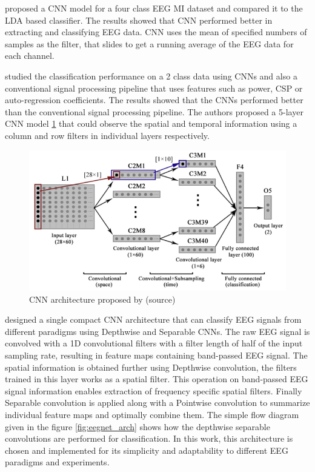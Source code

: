 \cite{2021_Online_EEG_MCNN} proposed a CNN model for a four class EEG MI dataset and compared it to the LDA based classifier. The results showed that CNN performed better in extracting and classifying EEG data. CNN uses the mean of specified numbers of samples as the filter, that slides to get a running average of the EEG data for each channel. 

\cite{2017_1trial_MIEEG_DNN} studied the classification performance on a 2 class data using CNNs and also a conventional signal processing pipeline that uses features such as power, CSP or auto-regression coefficients. The results showed that the CNNs performed better than the conventional signal processing pipeline. The authors proposed a 5-layer CNN model \ref{fig:2017_1trial_MIEEG_DNN_arch} that could observe the spatial and temporal information using a column and row filters in individual layers respectively.

    \begin{figure}[H] 
        \includegraphics[height=0.6\textwidth]{images/2017_1trial_MIEEG_DNN_arch.png}
        \caption{CNN architecture proposed by \cite{2017_1trial_MIEEG_DNN}(source)}
        \label{fig:2017_1trial_MIEEG_DNN_arch}
    \end{figure}

\cite{2018_EEGNet} designed a single compact CNN architecture that can classify EEG signals from different paradigms using Depthwise and Separable CNNs. The raw EEG signal is convolved with a 1D convolutional filters with a filter length of half of the input sampling rate, resulting in feature maps containing band-passed EEG signal. The spatial information is obtained further using Depthwise convolution, the filters trained in this layer works as a spatial filter. This operation on band-passed EEG signal information enables extraction of frequency specific spatial filters. Finally Separable convolution is applied along with a Pointwise convolution to summarize individual feature maps and optimally combine them. The simple flow diagram given in the figure \ref{fig:eegnet_arch} shows how the depthwise separable convolutions are performed for classification. In this work, this architecture is chosen and implemented for its simplicity and adaptability to different EEG paradigms and experiments.

